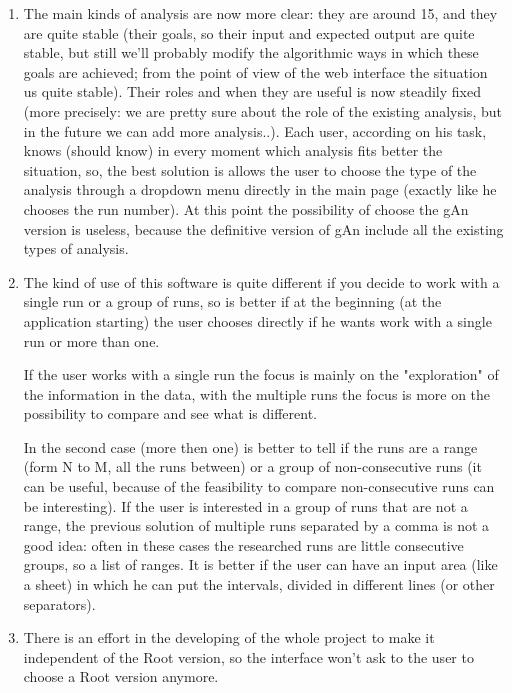 \begin{enumerate}
\item 
The main kinds of analysis are now more clear: they are around 15, and they are     quite stable (their goals, so their input and expected output are quite stable, but still we'll probably modify the algorithmic ways in which these goals are achieved; from the point of view of the web interface the situation us quite stable). Their roles and when they are useful is now steadily fixed (more precisely: we are pretty sure about the role of the existing analysis, but in the future we can add more analysis..). Each user, according on his task, knows (should know) in every moment which analysis fits better the situation, so, the best solution is allows the user to choose the type of the analysis through a dropdown menu directly in the main page (exactly like he chooses the run number). At this point the possibility of choose the gAn version is useless, because the definitive version of gAn include all the existing types of analysis. 

\item 
The kind of use of this software is quite different if you decide to work with a single run or a group of runs, so is better if at the beginning (at the application starting) the user chooses directly if he wants work with a single run or more than one. 

If the user works with a single run the focus is mainly on the "exploration" of the information in the data, with the multiple runs the focus is more on the possibility to compare and see what is different.

In the second case (more then one) is better to tell if the runs are a range (form N to M, all the runs between) or a group of non-consecutive runs (it can be useful, because of the feasibility to compare non-consecutive runs can be interesting). If the user is interested in a group of runs that are not a range, the previous solution of multiple runs separated by a comma is not a good idea: often in these cases the researched runs are little consecutive groups, so a list of ranges. It is better if the user can have an input area (like a sheet) in which he can put the intervals, divided in different lines (or other separators).

\item
There is an effort in the developing of the whole project to make it independent of the Root version, so the interface won't ask to the user to choose a Root version anymore. 

\end{enumerate}
 
